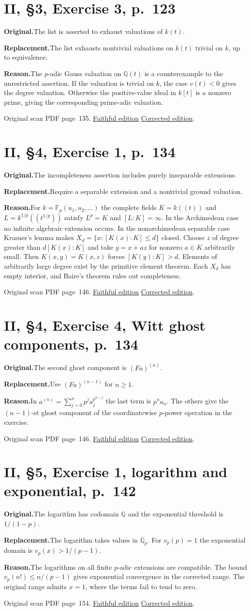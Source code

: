 \documentclass[11pt,a4paper]{article}
\newcommand{\original}{\par\smallskip\noindent\textbf{Original.}\enspace}
\newcommand{\replacement}{\par\smallskip\noindent\textbf{Replacement.}\enspace}
\newcommand{\reason}{\par\smallskip\noindent\textbf{Reason.}\enspace}
\newcommand{\editionlink}[3]{\href{#1\#errata.#2}{#3}}
\newcommand{\location}[2]{%
  \par\smallskip\noindent Original scan PDF page~#2.\enspace
  \editionlink{Neukirch_Faithful.pdf}{#1}{Faithful edition}
  \quad\editionlink{Neukirch_Corrected.pdf}{#1}{Corrected edition}.}
\begin{document}
\setcounter{section}{12}
\section{II, \S3, Exercise 3, p.~123}\label{errata:item:13}
\original The list is asserted to exhaust valuations of $k(t)$.
\replacement The list exhausts nontrivial valuations on $k(t)$ trivial on $k$, up to equivalence.
\reason The $p$-adic Gauss valuation on $\mathbb Q(t)$ is a counterexample to the unrestricted assertion. If the valuation is trivial on $k$, the case $v(t)<0$ gives the degree valuation. Otherwise the positive-value ideal in $k[t]$ is a nonzero prime, giving the corresponding prime-adic valuation.
\location{13}{135}

\setcounter{section}{13}
\section{II, \S4, Exercise 1, p.~134}\label{errata:item:14}
\original The incompleteness assertion includes purely inseparable extensions.
\replacement Require a separable extension and a nontrivial ground valuation.
\reason For $k=\mathbb F_p(u_1,u_2,\ldots)$ the complete fields $K=k((t))$ and $L=k^{1/p}((t^{1/p}))$ satisfy $L^p=K$ and $[L:K]=\infty$. In the Archimedean case no infinite algebraic extension occurs. In the nonarchimedean separable case Krasner\textquoteright{}s lemma makes $X_d=\{x:[K(x):K]\le d\}$ closed. Choose $z$ of degree greater than $d[K(x):K]$ and take $y=x+az$ for nonzero $a\in K$ arbitrarily small. Then $K(x,y)=K(x,z)$ forces $[K(y):K]>d$. Elements of arbitrarily large degree exist by the primitive element theorem. Each $X_d$ has empty interior, and Baire\textquoteright{}s theorem rules out completeness.
\location{14}{146}

\setcounter{section}{14}
\section{II, \S4, Exercise 4, Witt ghost components, p.~134}\label{errata:item:15}
\original The second ghost component is $(Fa)^{(n)}$.
\replacement Use $(Fa)^{(n-1)}$ for $n\ge1$.
\reason In $a^{(n)}=\sum_{j=0}^n p^j a_j^{p^{n-j}}$ the last term is $p^n a_n$. The others give the $(n-1)$-st ghost component of the coordinatewise $p$-power operation in the exercise.
\location{15}{146}

\setcounter{section}{15}
\section{II, \S5, Exercise 1, logarithm and exponential, p.~142}\label{errata:item:16}
\original The logarithm has codomain $\mathbb Q$ and the exponential threshold is $1/(1-p)$.
\replacement The logarithm takes values in $\overline{\mathbb Q}_p$. For $v_p(p)=1$ the exponential domain is $v_p(x)>1/(p-1)$.
\reason The logarithms on all finite $p$-adic extensions are compatible. The bound $v_p(n!)\le n/(p-1)$ gives exponential convergence in the corrected range. The original range admits $x=1$, where the terms fail to tend to zero.
\location{16}{154}
\end{document}
